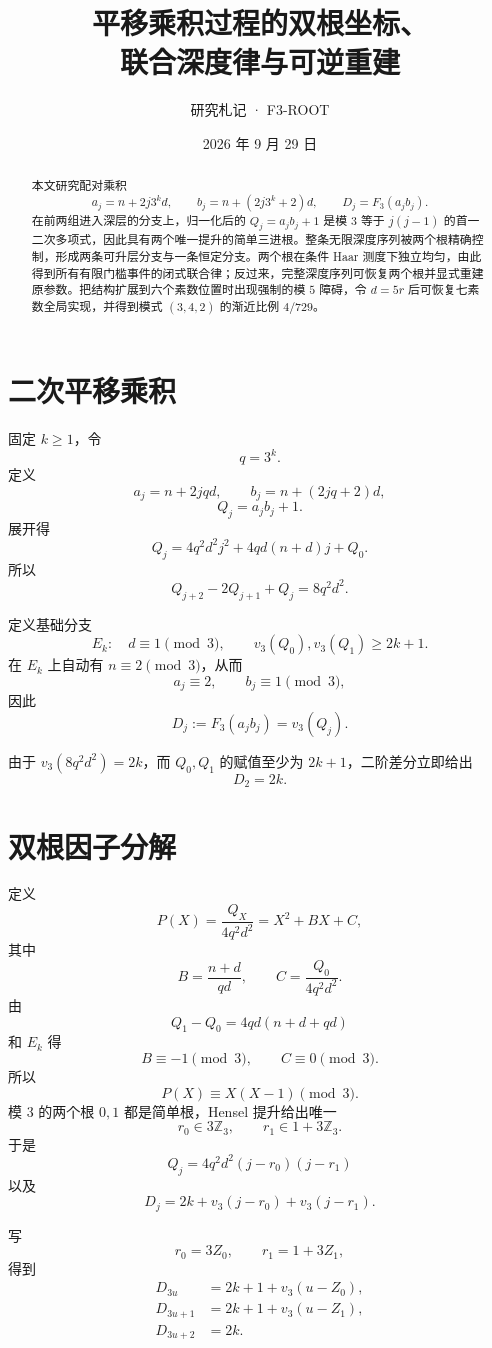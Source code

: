 \documentclass[11pt,a4paper]{ctexart}
\title{\bfseries 平移乘积过程的双根坐标、\\联合深度律与可逆重建}
\author{研究札记 · F3-ROOT}
\date{2026 年 9 月 29 日}
\begin{document}
\maketitle
\begin{abstract}
本文研究配对乘积
\[
a_j=n+2j3^k d,\qquad
b_j=n+(2j3^k+2)d,\qquad
D_j=F_3(a_jb_j).
\]
在前两组进入深层的分支上，归一化后的 \(Q_j=a_jb_j+1\) 是模 \(3\) 等于 \(j(j-1)\) 的首一二次多项式，因此具有两个唯一提升的简单三进根。整条无限深度序列被两个根精确控制，形成两条可升层分支与一条恒定分支。两个根在条件 Haar 测度下独立均匀，由此得到所有有限门槛事件的闭式联合律；反过来，完整深度序列可恢复两个根并显式重建原参数。把结构扩展到六个素数位置时出现强制的模 \(5\) 障碍，令 \(d=5r\) 后可恢复七素数全局实现，并得到模式 \((3,4,2)\) 的渐近比例 \(4/729\)。
\end{abstract}

\section{二次平移乘积}
固定 \(k\ge1\)，令
\[
q=3^k.
\]
定义
\[
a_j=n+2jqd,\qquad
b_j=n+(2jq+2)d,
\]
\[
Q_j=a_jb_j+1.
\]
展开得
\[
\boxed{
Q_j=4q^2d^2j^2+4qd(n+d)j+Q_0.
}
\]
所以
\[
Q_{j+2}-2Q_{j+1}+Q_j=8q^2d^2.
\]

定义基础分支
\[
E_k:\quad
d\equiv1\pmod3,\qquad
v_3(Q_0),v_3(Q_1)\ge2k+1.
\]
在 \(E_k\) 上自动有 \(n\equiv2\pmod3\)，从而
\[
a_j\equiv2,\qquad b_j\equiv1\pmod3,
\]
因此
\[
D_j:=F_3(a_jb_j)=v_3(Q_j).
\]

由于 \(v_3(8q^2d^2)=2k\)，而 \(Q_0,Q_1\) 的赋值至少为 \(2k+1\)，二阶差分立即给出
\[
\boxed{D_2=2k.}
\]

\section{双根因子分解}
定义
\[
P(X)=\frac{Q_X}{4q^2d^2}
=X^2+BX+C,
\]
其中
\[
B=\frac{n+d}{qd},
\qquad
C=\frac{Q_0}{4q^2d^2}.
\]
由
\[
Q_1-Q_0=4qd(n+d+qd)
\]
和 \(E_k\) 得
\[
B\equiv-1\pmod3,\qquad C\equiv0\pmod3.
\]
所以
\[
P(X)\equiv X(X-1)\pmod3.
\]
模 \(3\) 的两个根 \(0,1\) 都是简单根，Hensel 提升给出唯一
\[
r_0\in3\mathbb Z_3,\qquad
r_1\in1+3\mathbb Z_3.
\]
于是
\[
\boxed{
Q_j=4q^2d^2(j-r_0)(j-r_1)
}
\]
以及
\[
\boxed{
D_j=2k+v_3(j-r_0)+v_3(j-r_1).
}
\]

写
\[
r_0=3Z_0,\qquad r_1=1+3Z_1,
\]
得到
\[
\boxed{
\begin{aligned}
D_{3u}&=2k+1+v_3(u-Z_0),\\
D_{3u+1}&=2k+1+v_3(u-Z_1),\\
D_{3u+2}&=2k.
\end{aligned}}
\]
\end{document}

